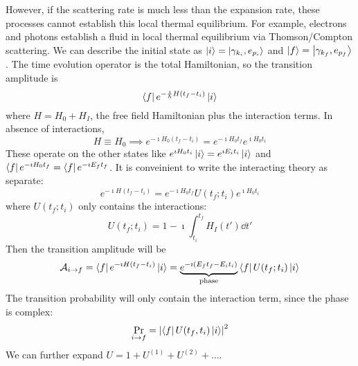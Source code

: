 \documentclass[a4paper,twoside,master.tex]{subfiles}
\begin{document}
However, if the scattering rate is much less than the expansion rate, these processes cannot establish this local thermal equilibrium. For example, electrons and photons establish a fluid in local thermal equilibrium via Thomson/Compton scattering. We can describe the initial state as $\ket{i} =\ket{\gamma_{k_i}, e_{p_i}} $ and $\ket{f} =\ket{\gamma_{k_f}, e_{p_f}} $. The time evolution operator is the total Hamiltonian, so the transition amplitude is
\begin{equation}
    \bra{f} e^{- \frac{\imath}{\hbar} H(t_f - t_i)}\ket{i}
\end{equation}
where $ H = H_0 + H_I $, the free field Hamiltonian plus the interaction terms. In absence of interactions,
\begin{equation}
    H \equiv H_0 \implies e^{- \imath H_0 (t_f - t_i)} = e^{- \imath H_0 t_f} e^{\imath H_0 t_i}
\end{equation}
These operate on the other states like $ e^{\imath H_0 t_i}\ket{i} = e^{\imath E_i t_i}\ket{i} $ and $\bra{f} e^{- \imath H_0 t_f} =\bra{f} e^{- \imath E_f t_f} $. It is conveinient to write the interacting theory as separate:
\begin{equation}
    e^{- \imath H(t_f - t_i)} = e^{- \imath H_0 t_f} U(t_f; t_i) e^{\imath H_0 t_i} 
\end{equation}
where $ U(t_f; t_i) $ only contains the interactions:
\begin{equation}
    U(t_f ; t_i) = 1 - \imath \int_{t_i}^{t_f} H_I(t') \dd{t'}
\end{equation}
Then the transition amplitude will be
\begin{equation}
    \mathcal{A}_{i \to f} =\bra{f} e^{- \imath H(t_f - t_i)}\ket{i} = \underbrace{e^{- \imath(E_f t_f - E_i t_i)}}_{\text{phase}}\bra{f} U(t_f; t_i)\ket{i}
\end{equation}
The transition probability will only contain the interaction term, since the phase is complex:
\begin{equation}
    \Pr_{i \to f} = \abs{\bra{f} U(t_f, t_i)\ket{i}}^2
\end{equation}
We can further expand $ U = 1 + U^{(1)} + U^{(2)} + \ldots $.
\end{document}
